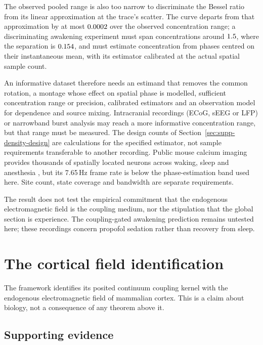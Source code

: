 \documentclass{article}
\renewcommand{\cite}[1]{\citep{#1}}
\begin{document}
The observed pooled range is also too narrow to discriminate the Bessel ratio from its linear approximation at the trace's scatter. The curve departs from that approximation by at most $0.0002$ over the observed concentration range; a discriminating awakening experiment must span concentrations around $1.5$, where the separation is $0.154$, and must estimate concentration from phases centred on their instantaneous mean, with its estimator calibrated at the actual spatial sample count.

An informative dataset therefore needs an estimand that removes the common rotation, a montage whose effect on spatial phase is modelled, sufficient concentration range or precision, calibrated estimators and an observation model for dependence and source mixing. Intracranial recordings (ECoG, sEEG or LFP) or narrowband burst analysis may reach a more informative concentration range, but that range must be measured. The design counts of Section~\ref{sec:supp-density-design} are calculations for the specified estimator, not sample requirements transferable to another recording. Public mouse calcium imaging provides thousands of spatially located neurons across waking, sleep and anesthesia \cite{oomoto2026}, but its 7.65\,Hz frame rate is below the phase-estimation band used here. Site count, state coverage and bandwidth are separate requirements.

The result does not test the empirical commitment that the endogenous electromagnetic field is the coupling medium, nor the stipulation that the global section is experience. The coupling-gated awakening prediction remains untested here; these recordings concern propofol sedation rather than recovery from sleep.

\section{The cortical field identification}
\label{sec:supp-field}

The framework identifies its posited continuum coupling kernel with the endogenous electromagnetic field of mammalian cortex. This is a claim about biology, not a consequence of any theorem above it.

\subsection{Supporting evidence}
\end{document}
